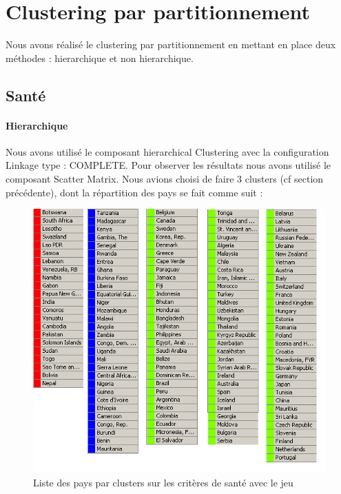 \section{Clustering par partitionnement}
Nous avons réalisé le clustering par partitionnement en mettant en place deux méthodes : hierarchique et non hierarchique. 

\subsection{Santé}

\paragraph{Hierarchique}
Nous avons utilisé le composant hierarchical Clustering avec la configuration Linkage type : COMPLETE. Pour observer les résultats nous avons utilisé le composant Scatter Matrix.
Nous avions choisi de faire 3 clusters (cf section précédente), dont la répartition des pays se fait comme suit : 

\begin{figure}[H]
	\begin{center}
		\includegraphics[scale=0.5]{Image/TableViewSanteNoMissing2}
		\caption{Liste des pays par clusters sur les critères de santé avec le jeu \jeuc}
	\end{center}
\end{figure}


